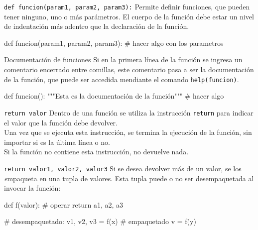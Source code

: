 \begin{referencia_python}

\begin{sintaxis}{\lstinline!def funcion(param1, param2, param3):!}
Permite definir funciones, que pueden tener ninguno, uno o más
parámetros.  El cuerpo de la función debe estar un nivel de indentación
más adentro que la declaración de la función.

\begin{codigo-python-sn}
def funcion(param1, param2, param3):
    # hacer algo con los parametros
\end{codigo-python-sn}
\end{sintaxis}

\begin{sintaxis}{Documentación de funciones}
Si en la primera línea de la función se ingresa un comentario
encerrado entre comillas, este comentario pasa a ser la documentación
de la función, que puede ser accedida mendiante el comando
\lstinline!help(funcion)!.
\begin{codigo-python-sn}
def funcion():
    """Esta es la documentación de la función"""
    # hacer algo
\end{codigo-python-sn}
\end{sintaxis}

\begin{sintaxis}{\lstinline!return valor!}
Dentro de una función se utiliza la instrucción \lstinline!return!
para indicar el valor que la función debe devolver. \\

Una vez que se ejecuta esta instrucción, se termina la ejecución de la
función, sin importar si es la última línea o no. \\

Si la función no contiene esta instrucción, no devuelve nada.
\end{sintaxis}

\begin{sintaxis}{\lstinline!return valor1, valor2, valor3!}
Si se desea devolver más de un valor, se los {\textit empaqueta} en
una tupla de valores.  Esta tupla puede o no ser desempaquetada al
invocar la función:
\begin{codigo-python-sn}
def f(valor):
    # operar
    return a1, a2, a3

# desempaquetado:
v1, v2, v3 = f(x)
# empaquetado
v = f(y)
\end{codigo-python-sn}
\end{sintaxis}

\end{referencia_python}

